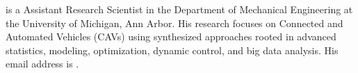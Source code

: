 \documentclass{wscpaperproc}
\theoremstyle{wsc}
\begin{document}
 is a Assistant Research Scientist in the Department of Mechanical Engineering at the University of Michigan, Ann Arbor. His research focuses on Connected and Automated Vehicles (CAVs) using synthesized approaches rooted in advanced statistics, modeling, optimization, dynamic control, and big data analysis. His email address is .\\
\end{document}
